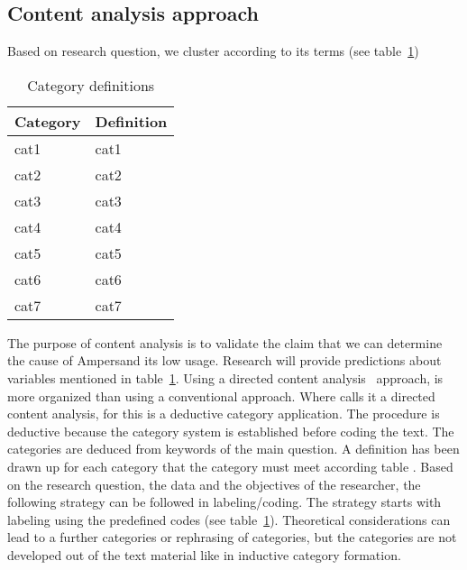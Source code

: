 \subsection{Content analysis approach}\label{subsection:content_analysis_approach}
Based on research question, we cluster according to its terms (see table~\ref{tab:Category_definitions})
\begin{table}[H]
    \caption{Category definitions}
    \begin{tabularx}{\linewidth}{|X|X|}
    \hline
        \textbf{Category} & \textbf{Definition} \\\hline
        \acrshort{cat1} & \acrlong{cat1} \\\hline
        \acrshort{cat2} & \acrlong{cat2} \\\hline
        \acrshort{cat3} & \acrlong{cat3} \\\hline
        \acrshort{cat4} & \acrlong{cat4} \\\hline
        \acrshort{cat5} & \acrlong{cat5} \\\hline
        \acrshort{cat6} & \acrlong{cat6} \\\hline
        \acrshort{cat7} & \acrlong{cat7} \\\hline
    \end{tabularx}
    \label{tab:Category_definitions}
\end{table}

The purpose of content analysis is to validate the claim that we can determine the cause of Ampersand its low usage.
Research will provide predictions about variables mentioned in table~\ref{tab:Category_definitions}.
Using a directed content analysis~\citep{hsieh_three_2005}  approach, is more organized than using a conventional approach.
Where \cite{hsieh_three_2005} calls it a directed content analysis, for \cite{mayring_qualitative_2019} this is a deductive category application.
The procedure is deductive because the category system is established before coding the text. 
The categories are deduced from keywords of the main question. 
A definition has been drawn up for each category that the category must meet according table .
Based on the research question, the data and the objectives of the researcher, the following strategy can be followed in labeling/coding.
The strategy starts with labeling using the predefined codes (see table~\ref{tab:Category_definitions}).
Theoretical considerations can lead to a further categories or rephrasing of categories, but the categories are not developed out of the text material like in inductive category formation.

